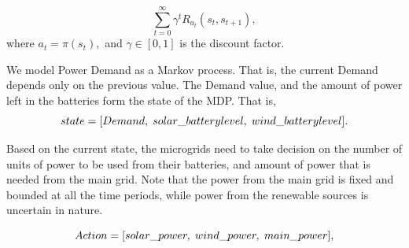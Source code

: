 \documentclass[conference]{IEEEtran}
\begin{document}
\begin{equation}
\sum_{t = 0}^{\infty} \gamma^{t}R_{a_{t}}(s_{t},s_{t+1}),
\end{equation}
where $a_{t} = \pi(s_{t}),$ and $\gamma \in [0,1]$ is the discount factor.

We model Power Demand as a Markov process. That is, the current Demand depends only on the previous value. The Demand value, and the amount of power left in the batteries form the state of the MDP. That is, 
\begin{equation}
 state = [Demand,\hspace{0.1cm} solar\_batterylevel,\hspace{0.1cm} wind\_batterylevel].
\end{equation}

Based on the current state, the microgrids need to take decision on the number of units of power to be used from their batteries, and amount of power that is needed from the main grid. Note that the power from the main grid is fixed and bounded at all the time periods, while power from the  renewable sources is uncertain in nature. 

\begin{equation}
Action = [solar\_power,\hspace{0.1cm} wind\_power,\hspace{0.1cm} main\_power],
\end{equation}
\end{document}
